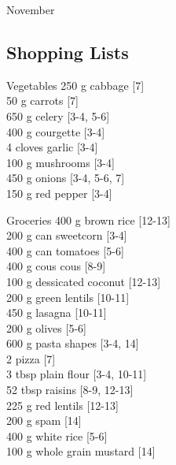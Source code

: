 \begin{menu}{November}
    \subsection*{Shopping Lists}
      \begin{shoppinglist}{Vegetables}
      250 g cabbage {\scriptsize[7]}\\
      50 g carrots {\scriptsize[7]}\\
      650 g celery {\scriptsize[3-4, 5-6]}\\
      400 g courgette {\scriptsize[3-4]}\\
      4 cloves garlic {\scriptsize[3-4]}\\
      100 g mushrooms {\scriptsize[3-4]}\\
      450 g onions {\scriptsize[3-4, 5-6, 7]}\\
      150 g red pepper {\scriptsize[3-4]}\\
      \end{shoppinglist}%
      \begin{shoppinglist}{Groceries}
      400 g brown rice {\scriptsize[12-13]}\\
      200 g can sweetcorn {\scriptsize[3-4]}\\
      400 g can tomatoes {\scriptsize[5-6]}\\
      400 g cous cous {\scriptsize[8-9]}\\
      100 g dessicated coconut {\scriptsize[12-13]}\\
      200 g green lentils {\scriptsize[10-11]}\\
      450 g lasagna {\scriptsize[10-11]}\\
      200 g olives {\scriptsize[5-6]}\\
      600 g pasta shapes {\scriptsize[3-4, 14]}\\
      2  pizza {\scriptsize[7]}\\
      3 tbsp plain flour {\scriptsize[3-4, 10-11]}\\
      52 tbsp raisins {\scriptsize[8-9, 12-13]}\\
      225 g red lentils {\scriptsize[12-13]}\\
      200 g spam {\scriptsize[14]}\\
      400 g white rice {\scriptsize[5-6]}\\
      100 g whole grain mustard {\scriptsize[14]}\\
      \end{shoppinglist}%
      \par\vfil %

\end{menu}
